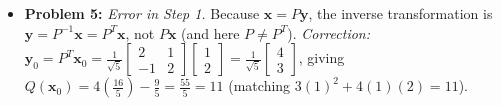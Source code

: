 \documentclass[11pt, letterpaper]{article}
\theoremstyle{definition}
\theoremstyle{remark}
\begin{document}
\begin{itemize}
    \item \textbf{Problem 5:} \emph{Error in Step 1.} Because $\mathbf{x} = P\mathbf{y}$, the inverse transformation is $\mathbf{y} = P^{-1}\mathbf{x} = P^T \mathbf{x}$, not $P\mathbf{x}$ (and here $P \ne P^T$). \emph{Correction:} $\mathbf{y}_0 = P^T \mathbf{x}_0 = \frac{1}{\sqrt{5}}\begin{bmatrix} 2 & 1 \\ -1 & 2 \end{bmatrix}\begin{bmatrix} 1 \\ 2 \end{bmatrix} = \frac{1}{\sqrt{5}}\begin{bmatrix} 4 \\ 3 \end{bmatrix}$, giving $Q(\mathbf{x}_0) = 4\left(\frac{16}{5}\right) - \frac{9}{5} = \frac{55}{5} = 11$ (matching $3(1)^2 + 4(1)(2) = 11$).
\end{itemize}
\end{document}
